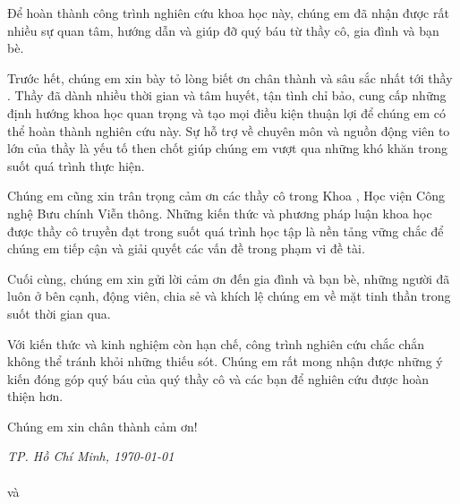 \begin{acknowledgments}
\setlength{\parskip}{6pt} %

Để hoàn thành công trình nghiên cứu khoa học này, chúng em đã nhận được rất nhiều sự quan tâm, hướng dẫn và giúp đỡ quý báu từ thầy cô, gia đình và bạn bè.

Trước hết, chúng em xin bày tỏ lòng biết ơn chân thành và sâu sắc nhất tới thầy \textbf{\supervisor}. Thầy đã dành nhiều thời gian và tâm huyết, tận tình chỉ bảo, cung cấp những định hướng khoa học quan trọng và tạo mọi điều kiện thuận lợi để chúng em có thể hoàn thành nghiên cứu này. Sự hỗ trợ về chuyên môn và nguồn động viên to lớn của thầy là yếu tố then chốt giúp chúng em vượt qua những khó khăn trong suốt quá trình thực hiện.

Chúng em cũng xin trân trọng cảm ơn các thầy cô trong Khoa \faculty, Học viện Công nghệ Bưu chính Viễn thông. Những kiến thức và phương pháp luận khoa học được thầy cô truyền đạt trong suốt quá trình học tập là nền tảng vững chắc để chúng em tiếp cận và giải quyết các vấn đề trong phạm vi đề tài.

Cuối cùng, chúng em xin gửi lời cảm ơn đến gia đình và bạn bè, những người đã luôn ở bên cạnh, động viên, chia sẻ và khích lệ chúng em về mặt tinh thần trong suốt thời gian qua.

Với kiến thức và kinh nghiệm còn hạn chế, công trình nghiên cứu chắc chắn không thể tránh khỏi những thiếu sót. Chúng em rất mong nhận được những ý kiến đóng góp quý báu của quý thầy cô và các bạn để nghiên cứu được hoàn thiện hơn.

Chúng em xin chân thành cảm ơn!

\vspace{2cm}
\begin{flushright}
    \textit{TP. Hồ Chí Minh, \today} \\
     \\[2.5cm]

    \textbf{\studentname} và \textbf{\studentnametwo}\\
\end{flushright}
\end{acknowledgments}